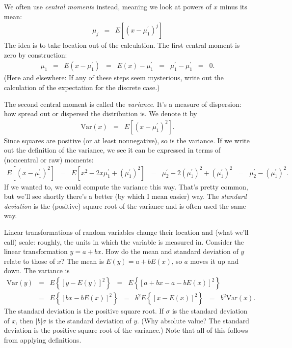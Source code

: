 \documentclass[11pt]{article}
\begin{document}
We often use {\it central moments\/} instead, meaning we look at powers
of $x$ minus its mean:
\begin{eqnarray*}
    \mu_j &=& E [(x-\mu_1^\prime)^j]
\end{eqnarray*}
The idea is to take location out of the calculation.
The first central moment is zero by construction:
\begin{eqnarray*}
    \mu_1 &=& E (x-\mu_1^\prime)
            \;\;=\;\;  E(x) - \mu_1^\prime
            \;\;=\;\;  \mu_1^\prime - \mu_1^\prime  \;\;=\;\; 0.
\end{eqnarray*}
(Here and elsewhere: If any of these steps seem mysterious,
write out the calculation of the expectation for the discrete case.)


The second central moment is called the {\it variance\/}.
It's a measure of dispersion:  how spread out or dispersed the distribution is.
We denote it by
\begin{eqnarray*}
    \mbox{Var}(x)  &=&  E [(x-\mu_1^\prime)^2] .
\end{eqnarray*}
Since squares are positive (or at least nonnegative), so is the variance.
If we write out the definition of the variance,
we see it can be expressed in terms of (noncentral or raw) moments:
\begin{eqnarray*}
    E [(x-\mu_1^\prime)^2]  &=&  E [x^2 - 2 x\mu_1^\prime + (\mu_1^\prime)^2]
            \;\;=\;\; \mu_2^\prime - 2 (\mu_1^\prime)^2 + (\mu_1^\prime)^2
            \;\;=\;\; \mu_2^\prime -  (\mu_1^\prime)^2 .
\end{eqnarray*}
If we wanted to, we could compute the variance this way.
That's pretty common, but we'll see shortly there's a
better (by which I mean easier) way.
The {\it standard deviation\/} is the (positive) square root of the variance
and is often used the same way.

Linear transformations of random variables change their location
and (what we'll call) scale:  roughly, the units in which the variable is measured in.
Consider the linear transformation $ y = a + b x$.
How do the  mean and standard deviation of $y$ relate to those of $x$?
The mean is $ E(y) = a + b E(x)$,
so $a$ moves it up and down.
The variance is
\begin{eqnarray*}
    \mbox{Var}(y) &=& E \left\{ [y - E(y)]^2 \right\}
        \;\;=\;\; E \left\{ [a + b x - a - b E(x)]^2 \right\} \\
        &=& E \left\{  [ b x - b E(x)]^2 \right\}
        \;\;=\;\; b^2 E \left\{ [ x - E(x)]^2 \right\}
        \;\;=\;\; b^2 \mbox{Var}(x) .
\end{eqnarray*}
The standard deviation is the positive square root.
If $\sigma$ is the standard deviation of $x$,
then $|b| \sigma$ is the standard deviation of $y$.
(Why absolute value?  The standard deviation is the positive square root of the variance.)
Note that all of this follows from applying definitions.
\end{document}
